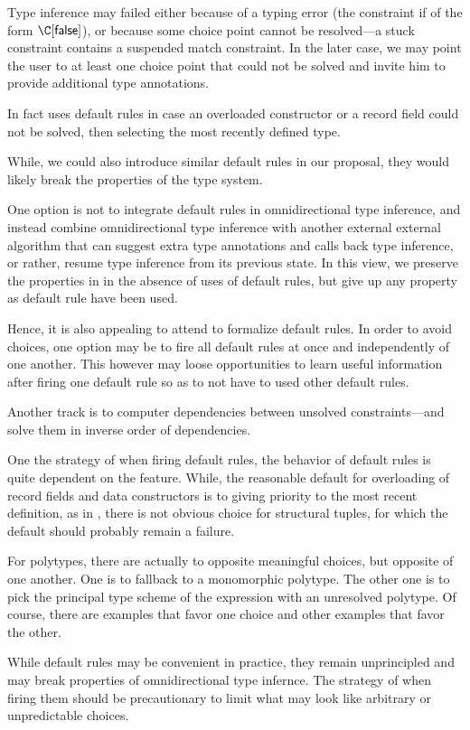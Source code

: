 \documentclass[acmsmall,screen,nonacm,review]{acmart}
\begin{document}
Type inference may failed either because of a typing error (the constraint
if of the form $\C \where \cfalse$), or because some choice point cannot be
resolved---a stuck constraint contains a suspended match constraint.
%
In the later case, we may point the user to at least one choice point that
could not be solved and invite him to provide additional type annotations.

In fact \OCaml uses default rules in case an overloaded constructor or a record
field could not be solved, then selecting the most recently defined type.

While, we could also introduce similar default rules in our proposal, they
would likely break the properties of the type system.

One option is not to integrate default rules in omnidirectional type
inference, and instead combine omnidirectional type inference with another
external external algorithm that can suggest extra type annotations and
calls back type inference, or rather, resume type inference from its
previous state.  In this view, we preserve the properties in
in the absence of uses of default rules, but give up any property
as default rule have been used.

Hence, it is also appealing to attend to formalize default rules.  In order
to avoid choices, one option may be to fire all default rules at once and
independently of one another.  This however may loose opportunities to learn
useful information after firing one default rule so as to not have to used
other default rules.

Another track is to computer dependencies between unsolved constraints---and
solve them in inverse order of dependencies.

One the strategy of when firing default rules, the behavior of default rules
is quite dependent on the feature.  While, the reasonable default for
overloading of record fields and data constructors is to giving priority to
the most recent definition, as in \OCaml, there is not obvious choice for
structural tuples, for which the default should probably remain a failure.

For polytypes, there are actually to opposite meaningful choices, but
opposite of one another. One is to fallback to a monomorphic polytype.  The
other one is to pick the principal type scheme of the expression with an
unresolved polytype.  Of course, there are examples that favor one choice
and other examples that favor the other.

While default rules may be convenient in practice, they remain unprincipled
and may break properties of omnidirectional type infernce.  The strategy of
when firing them should be precautionary to limit what may look like
arbitrary or unpredictable choices.
\end{document}

